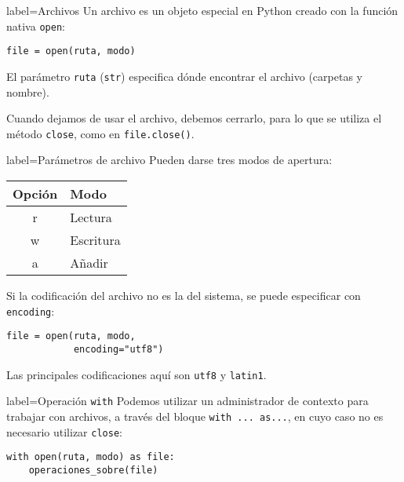
\begin{contentbox}{label=Archivos}
    Un archivo es un objeto especial en Python creado con la función nativa \lstinline!open!:
    
    \begin{center}
        \lstinline!file = open(ruta, modo)!
    \end{center}
    
    El parámetro \texttt{ruta} (\lstinline!str!) especifica dónde encontrar el archivo (carpetas y nombre).
    
    Cuando dejamos de usar el archivo, debemos cerrarlo, para lo que se utiliza el método \lstinline!close!, como en \lstinline!file.close()!.
\end{contentbox}
    
\begin{contentbox}{label=Parámetros de archivo}
    Pueden darse tres modos de apertura:
    
    \begin{center}
        \begin{tabular}{C|p{0.5\textwidth}}
            \textnormal{Opción} & Modo \\
            \hline
            r & Lectura \\
            w & Escritura \\
            a & Añadir
        \end{tabular}
    \end{center}
    
    Si la codificación del archivo no es la del sistema, se puede especificar con \lstinline!encoding!:
    \begin{lstlisting}
file = open(ruta, modo,
            encoding="utf8")
    \end{lstlisting}
    
    Las principales codificaciones aquí son \lstinline!utf8! y \lstinline!latin1!.
\end{contentbox}
    
\begin{contentbox}{label=Operación \lstinline!with!}
    Podemos utilizar un administrador de contexto para trabajar con archivos, a través del bloque \lstinline!with ... as...!, en cuyo caso no es necesario utilizar \lstinline!close!:
    \begin{lstlisting}
with open(ruta, modo) as file:
    operaciones_sobre(file)
    \end{lstlisting}
\end{contentbox}


